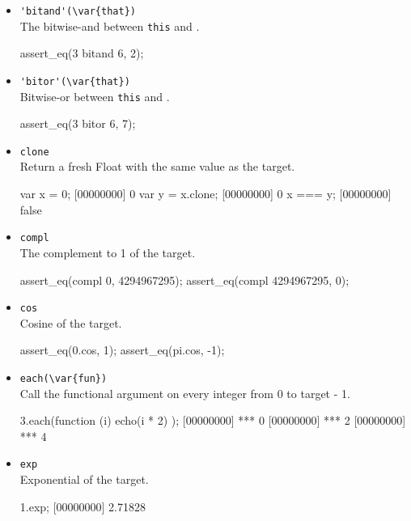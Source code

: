 \begin{itemize}
\item \lstinline|'bitand'(\var{that})|\\
  The bitwise-and between \lstinline|this| and .
\begin{urbiscript}[firstnumber=last]
assert_eq(3 bitand 6, 2);
\end{urbiscript}

\item \lstinline|'bitor'(\var{that})|\\
  Bitwise-or between \lstinline|this| and .
\begin{urbiscript}[firstnumber=last]
assert_eq(3 bitor 6, 7);
\end{urbiscript}

\item \lstinline|clone|\\
  Return a fresh Float with the same value as the target.
\begin{urbiscript}[firstnumber=last]
var x = 0;
[00000000] 0
var y = x.clone;
[00000000] 0
x === y;
[00000000] false
\end{urbiscript}

\item \lstinline|compl|\\
  The complement to 1 of the target.
\begin{urbiscript}[firstnumber=last]
assert_eq(compl 0, 4294967295);
assert_eq(compl 4294967295, 0);
\end{urbiscript}

\item \lstinline|cos|\\
  Cosine of the target.
\begin{urbiscript}[firstnumber=last]
assert_eq(0.cos, 1);
assert_eq(pi.cos, -1);
\end{urbiscript}

\item \lstinline|each(\var{fun})|\\
  Call the functional argument  on every integer from 0 to
  target - 1.
\begin{urbiscript}[firstnumber=last]
3.each(function (i) { echo(i * 2) });
[00000000] *** 0
[00000000] *** 2
[00000000] *** 4
\end{urbiscript}

\item \lstinline|exp|\\
  Exponential of the target.
\begin{urbiscript}[firstnumber=last]
1.exp;
[00000000] 2.71828
\end{urbiscript}


\end{itemize}
